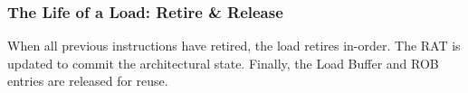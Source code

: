 \documentclass[aspectratio=169,12pt]{beamer}
\begin{document}
\begin{frame}
\frametitle{The Life of a Load: Retire \& Release}
\begin{center}
\LoadLifecycleDiagram[
    iq1={R3$\leftarrow$MEM(R2+50)},
    lbV={1},
    lbAddr={V(R2+50)},
    lbBC={0}
]
\end{center}
\vspace{-2mm}
\begin{tcolorbox}[colback=blue!5!white,colframe=blue!75!black]
When all previous instructions have retired, the load retires in-order. The RAT is updated to commit the architectural state. Finally, the Load Buffer and ROB entries are released for reuse.
\end{tcolorbox}
\end{frame}

\end{document}
